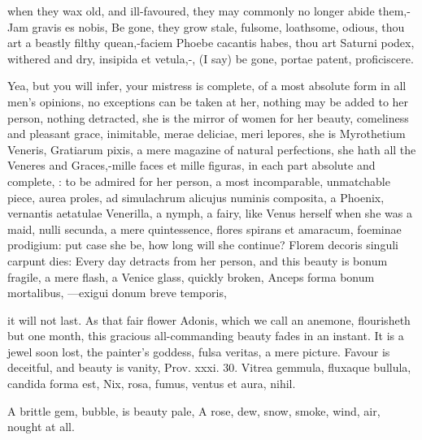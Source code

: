 {when they wax old, and ill-favoured, they may commonly no longer abide
them,-Jam gravis es nobis, Be gone, they grow stale, fulsome,
loathsome, odious, thou art a beastly filthy quean,-faciem Phoebe
cacantis habes, thou art Saturni podex, withered and dry, insipida et
vetula,-, (I say) be gone,
portae patent, proficiscere.

Yea, but you will infer, your mistress is complete, of a most absolute
form in all men's opinions, no exceptions can be taken at her, nothing
may be added to her person, nothing detracted, she is the mirror of
women for her beauty, comeliness and pleasant grace, inimitable, merae
deliciae, meri lepores, she is Myrothetium Veneris, Gratiarum pixis, a
mere magazine of natural perfections, she hath all the Veneres and
Graces,-mille faces et mille figuras, in each part absolute and
complete, : to be
admired for her person, a most incomparable, unmatchable piece, aurea
proles, ad simulachrum alicujus numinis composita, a Phoenix, vernantis
aetatulae Venerilla, a nymph, a fairy, like Venus herself when
she was a maid, nulli secunda, a mere quintessence, flores spirans et
amaracum, foeminae prodigium: put case she be, how long will she
continue? Florem decoris singuli carpunt dies: Every day detracts
from her person, and this beauty is bonum fragile, a mere flash, a
Venice glass, quickly broken,
Anceps forma bonum mortalibus,
---exigui donum breve temporis,

it will not last. As that fair flower Adonis, which we call an
anemone, flourisheth but one month, this gracious all-commanding beauty
fades in an instant. It is a jewel soon lost, the painter's goddess,
fulsa veritas, a mere picture. Favour is deceitful, and beauty is
vanity, Prov. xxxi. 30.
Vitrea gemmula, fluxaque bullula, candida forma est,
Nix, rosa, fumus, ventus et aura, nihil.

A brittle gem, bubble, is beauty pale,
A rose, dew, snow, smoke, wind, air, nought at all.

}
